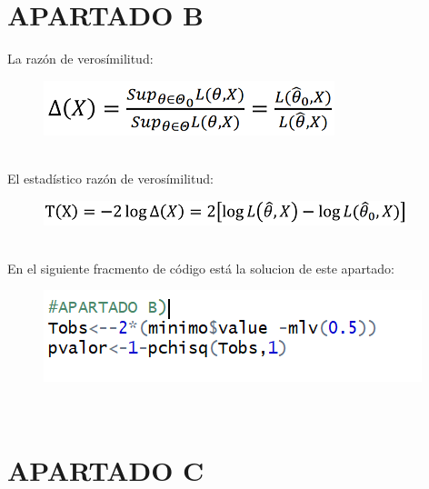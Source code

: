 \documentclass[10pt,a4paper]{article}
\begin{document}
\section{APARTADO B} 
La razón de verosímilitud:
\begin{figure}[h]
	\includegraphics[scale=0.3]{razon de verosimilitud.PNG}
	\centering
\end{figure}\\
El estadístico razón de verosímilitud:\\
\begin{figure}[h]
	\includegraphics[scale=0.3]{estadistico.PNG}
	\centering
\end{figure}\\
En el siguiente fracmento de código está la solucion de este apartado:
\begin{figure}[h]
	\includegraphics[scale=1]{apartadob.PNG}
	\centering
	\\
	\centering
\end{figure}\\
\newpage
\section{APARTADO C}
\end{document}

